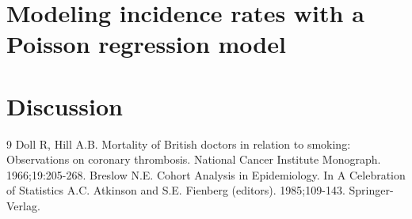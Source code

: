 \documentclass[10pt,a4paper,twoside]{article}\usepackage[]{graphicx}\usepackage[]{xcolor}
\begin{document}
\section{Modeling incidence rates with a Poisson regression model}
\label{sec:PoissonModel}

\section{Discussion}
\label{sec:Discussion}



\newpage
\begin{thebibliography}{9}
 Doll R, Hill A.B. Mortality of British doctors in relation to smoking: Observations on coronary thrombosis. National Cancer Institute Monograph. 1966;19:205-268.
 Breslow N.E. Cohort Analysis in Epidemiology. In A Celebration of Statistics A.C. Atkinson and S.E. Fienberg (editors). 1985;109-143. Springer-Verlag.
\end{thebibliography}
\end{document}
